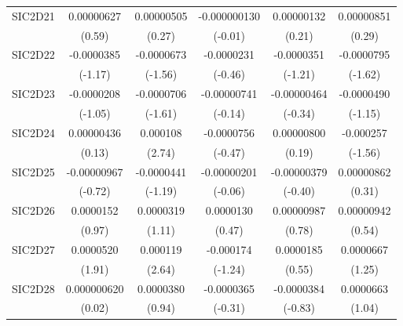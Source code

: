 \begin{table}[htbp]
\begin{tabular}{l*{5}{c}}
SIC2D21     &  0.00000627         &  0.00000505         &-0.000000130         &  0.00000132         &  0.00000851         \\
            &      (0.59)         &      (0.27)         &     (-0.01)         &      (0.21)         &      (0.29)         \\
SIC2D22     &  -0.0000385         &  -0.0000673         &  -0.0000231         &  -0.0000351         &  -0.0000795         \\
            &     (-1.17)         &     (-1.56)         &     (-0.46)         &     (-1.21)         &     (-1.62)         \\
SIC2D23     &  -0.0000208         &  -0.0000706         & -0.00000741         & -0.00000464         &  -0.0000490         \\
            &     (-1.05)         &     (-1.61)         &     (-0.14)         &     (-0.34)         &     (-1.15)         \\
SIC2D24     &  0.00000436         &    0.000108\sym{**} &  -0.0000756         &  0.00000800         &   -0.000257         \\
            &      (0.13)         &      (2.74)         &     (-0.47)         &      (0.19)         &     (-1.56)         \\
SIC2D25     & -0.00000967         &  -0.0000441         & -0.00000201         & -0.00000379         &  0.00000862         \\
            &     (-0.72)         &     (-1.19)         &     (-0.06)         &     (-0.40)         &      (0.31)         \\
SIC2D26     &   0.0000152         &   0.0000319         &   0.0000130         &  0.00000987         &  0.00000942         \\
            &      (0.97)         &      (1.11)         &      (0.47)         &      (0.78)         &      (0.54)         \\
SIC2D27     &   0.0000520         &    0.000119\sym{**} &   -0.000174         &   0.0000185         &   0.0000667         \\
            &      (1.91)         &      (2.64)         &     (-1.24)         &      (0.55)         &      (1.25)         \\
SIC2D28     & 0.000000620         &   0.0000380         &  -0.0000365         &  -0.0000384         &   0.0000663         \\
            &      (0.02)         &      (0.94)         &     (-0.31)         &     (-0.83)         &      (1.04)         \\

\end{tabular}
\end{table}
